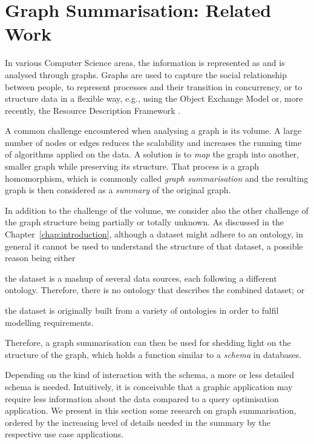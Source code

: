 \chapter{Graph Summarisation: Related Work}
\label{chap:graph-summary:related-work}

In various Computer Science areas, the information is represented as and is analysed through graphs. Graphs are used to capture the social relationship between people, to represent processes and their transition in concurrency, or to structure data in a flexible way, e.g., using the Object Exchange Model \cite{papakonstantinou:1995:oea} or, more recently, the Resource Description Framework \cite{rdfconcepts}.

A common challenge encountered when analysing a graph is its volume. A large number of nodes or edges reduces the scalability and increases the running time of algorithms applied on the data. A solution is to \emph{map} the graph into another, smaller graph while preserving its structure. That process is a graph homomorphism, which is commonly called \emph{graph summarisation} and the resulting graph is then considered as a \emph{summary} of the original graph.

In addition to the challenge of the volume, we consider also the other challenge of the graph structure being partially or totally unknown. As discussed in the Chapter~\ref{chap:introduction}, although a dataset might adhere to an ontology, in general it cannot be used to understand the structure of that dataset, a possible reason being either
\begin{inparaenum}[(a)]
\item the dataset is a mashup of several data sources, each following a different ontology. Therefore, there is no ontology that describes the combined dataset; or
\item the dataset is originally built from a variety of ontologies in order to fulfil modelling requirements.
\end{inparaenum}
Therefore, a graph summarisation can then be used for shedding light on the structure of the graph, which holds a function similar to a \emph{schema} in databases.

Depending on the kind of interaction with the schema, a more or less detailed schema is needed. Intuitively, it is conceivable that a graphic application may require less information about the data compared to a query optimisation application. We present in this section some research on graph summarisation, ordered by the increasing level of details needed in the summary by the respective use case applications.

